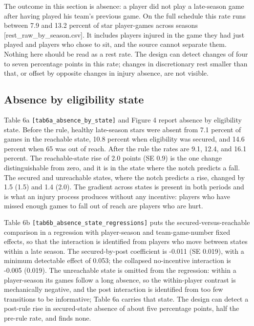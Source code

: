\documentclass[11pt]{article}
\begin{document}
The outcome in this section is absence: a player did not play a late-season game after having played his team's previous game. On the full schedule this rate runs between 7.9 and 13.2 percent of star player-games across seasons [rest\_raw\_by\_season.csv]. It includes players injured in the game they had just played and players who chose to sit, and the source cannot separate them. Nothing here should be read as a rest rate. The design can detect changes of four to seven percentage points in this rate; changes in discretionary rest smaller than that, or offset by opposite changes in injury absence, are not visible.


\subsection*{Absence by eligibility state}


Table 6a {\small\texttt{[tab6a\_absence\_by\_state]}} and Figure 4 report absence by eligibility state. Before the rule, healthy late-season stars were absent from 7.1 percent of games in the reachable state, 10.8 percent when eligibility was secured, and 14.6 percent when 65 was out of reach. After the rule the rates are 9.1, 12.4, and 16.1 percent. The reachable-state rise of 2.0 points (SE 0.9) is the one change distinguishable from zero, and it is in the state where the notch predicts a fall. The secured and unreachable states, where the notch predicts a rise, changed by 1.5 (1.5) and 1.4 (2.0). The gradient across states is present in both periods and is what an injury process produces without any incentive: players who have missed enough games to fall out of reach are players who are hurt.

Table 6b {\small\texttt{[tab6b\_absence\_state\_regressions]}} puts the secured-versus-reachable comparison in a regression with player-season and team-game-number fixed effects, so that the interaction is identified from players who move between states within a late season. The secured-by-post coefficient is -0.011 (SE 0.019), with a minimum detectable effect of 0.053; the collapsed no-incentive interaction is -0.005 (0.019). The unreachable state is omitted from the regression: within a player-season its games follow a long absence, so the within-player contrast is mechanically negative, and the post interaction is identified from too few transitions to be informative; Table 6a carries that state. The design can detect a post-rule rise in secured-state absence of about five percentage points, half the pre-rule rate, and finds none.
\end{document}
